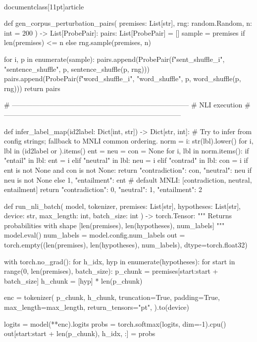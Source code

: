 \\documentclass[11pt]{article}
\begin{document}
\begin{CodeBlock}
def gen_corpus_perturbation_pairs(
    premises: List[str],
    rng: random.Random,
    n: int = 200
) -> List[ProbePair]:
    pairs: List[ProbePair] = []
    sample = premises if len(premises) <= n else rng.sample(premises, n)

    for i, p in enumerate(sample):
        pairs.append(ProbePair(f"sent_shuffle_{i}", "sentence_shuffle", p, sentence_shuffle(p, rng)))
        pairs.append(ProbePair(f"word_shuffle_{i}", "word_shuffle", p, word_shuffle(p, rng)))
    return pairs


# -----------------------------------------------------------------------------
# NLI execution
# -----------------------------------------------------------------------------

def infer_label_map(id2label: Dict[int, str]) -> Dict[str, int]:
    # Try to infer from config strings; fallback to MNLI common ordering.
    norm = {i: str(lbl).lower() for i, lbl in (id2label or {}).items()}
    ent = neu = con = None
    for i, lbl in norm.items():
        if "entail" in lbl:
            ent = i
        elif "neutral" in lbl:
            neu = i
        elif "contrad" in lbl:
            con = i
    if ent is not None and con is not None:
        return {"contradiction": con, "neutral": neu if neu is not None else 1, "entailment": ent}
    # default MNLI: [contradiction, neutral, entailment]
    return {"contradiction": 0, "neutral": 1, "entailment": 2}

def run_nli_batch(
    model,
    tokenizer,
    premises: List[str],
    hypotheses: List[str],
    device: str,
    max_length: int,
    batch_size: int
) -> torch.Tensor:
    """
    Returns probabilities with shape [len(premises), len(hypotheses), num_labels]
    """
    model.eval()
    num_labels = model.config.num_labels
    out = torch.empty((len(premises), len(hypotheses), num_labels), dtype=torch.float32)

    with torch.no_grad():
        for h_idx, hyp in enumerate(hypotheses):
            for start in range(0, len(premises), batch_size):
                p_chunk = premises[start:start + batch_size]
                h_chunk = [hyp] * len(p_chunk)

                enc = tokenizer(
                    p_chunk,
                    h_chunk,
                    truncation=True,
                    padding=True,
                    max_length=max_length,
                    return_tensors="pt",
                ).to(device)

                logits = model(**enc).logits
                probs = torch.softmax(logits, dim=-1).cpu()
                out[start:start + len(p_chunk), h_idx, :] = probs


\end{CodeBlock}
\end{document}
